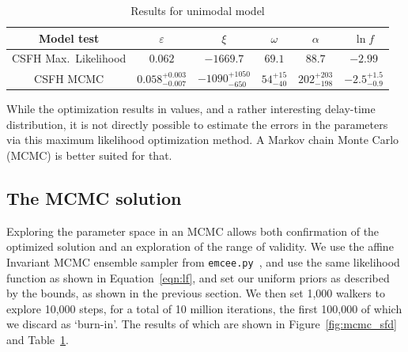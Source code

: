 \documentclass[apj]{aastex}
\begin{document}
\begin{table}
    \centering
    \caption{Results for unimodal model}
    \label{tab:results}
    \begin{tabular}{cccccc}
        \hline
                Model test & $\varepsilon$ & $\xi$ & $\omega$ & $\alpha$ & $\ln f$ \\ 
                \hline
		CSFH Max.~Likelihood &$0.062$&$-1669.7$& $69.1$& $88.7$& $-2.99$\\
                CSFH MCMC & $0.058^{+0.003}_{-0.007}$ & $-1090^{+1050}_{-650}$ &$54^{+15}_{-40}$& $202^{+203}_{-198}$&  $-2.5^{+1.5}_{-0.9}$\\
                \hline
    \end{tabular}
\end{table}

While the optimization results in values, and a rather interesting delay-time distribution, it is not directly possible to estimate the errors in the parameters via this maximum likelihood optimization method. A Markov chain Monte Carlo (MCMC) is better suited for that.

\subsection{The MCMC solution\label{sec:mcmc_sfd}}
Exploring the parameter space in an MCMC allows both confirmation of the optimized solution and an exploration of the range of validity. We use the affine Invariant MCMC ensemble sampler from {\tt emcee.py}~\citep{Foreman-Mackey:2013pd}, and use the same likelihood function as shown in Equation~\ref{eqn:lf}, and set our uniform priors as described by the bounds, as shown in the previous section. We then set 1,000 walkers to explore 10,000 steps, for a total of 10 million iterations, the first 100,000 of which we discard as `burn-in'. The results of which are shown in Figure~\ref{fig:mcmc_sfd} and Table~\ref{tab:results}.
\end{document}
